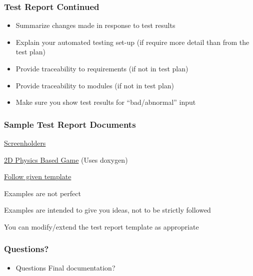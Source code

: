 \documentclass[t,12pt,numbers,fleqn]{beamer}
\begin{document}

\begin{frame}
\frametitle{Test Report Continued}
\begin{itemize}
\item Summarize changes made in response to test results
\item Explain your automated testing set-up (if require more detail than from
  the test plan)
\item Provide traceability to requirements (if not in test plan)
\item Provide traceability to modules (if not in test plan)
\item Make sure you show test results for ``bad/abnormal'' input
\end{itemize}
\end{frame}


\begin{frame}
\frametitle{Sample Test Report Documents} 

\bi
\item
  \href{https://gitlab.cas.mcmaster.ca/screenholders/screenholders}{Screenholders}
\item
  \href{https://github.com/palmerst/CS-4ZP6/tree/master}{2D Physics Based Game}
  (Uses doxygen)
\item
  \href{https://gitlab.cas.mcmaster.ca/smiths/cas741/tree/master/BlankProjectTemplate/Doc/TestReport}{Follow given template}
\item Examples are not perfect
\item Examples are intended to give you ideas, not to be strictly followed
\item You can modify/extend the test report template as appropriate
\ei

\end{frame}


\begin{frame}
\frametitle{Questions?}
\begin{itemize}
\item Questions Final documentation?
\end{itemize}
\end{frame}

\end{document}
